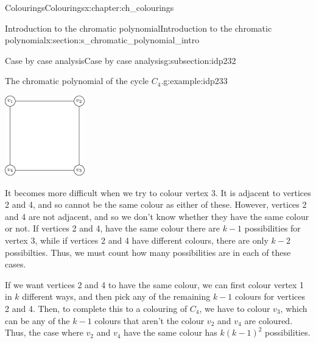 \documentclass[oneside,10pt,]{book}
\numberwithin{equation}{section}
\begin{document}
\begin{chapterptx}{Colourings}{}{Colourings}{}{}{x:chapter:ch_colourings}
\begin{sectionptx}{Introduction to the chromatic polynomial}{}{Introduction to the chromatic polynomial}{}{}{x:section:s_chromatic_polynomial_intro}
\begin{subsectionptx}{Case by case analysis}{}{Case by case analysis}{}{}{g:subsection:idp232}
\begin{example}{The chromatic polynomial of the cycle \(C_4\).}{g:example:idp233}
\begin{sidebyside}{2}{0.025}{0.025}{0.05}
\begin{sbspanel}{0.6}
\end{sbspanel}%
\begin{sbspanel}{0.3}%
\includegraphics[width=\linewidth]{images/c4.png}
\end{sbspanel}%
\end{sidebyside}%
It becomes more difficult when we try to colour vertex 3.  It is adjacent to vertices 2 and 4, and so cannot be the same colour as either of these.  However, vertices 2 and 4 are not adjacent, and so we don't know whether they have the same colour or not.  If vertices 2 and 4, have the same colour there are \(k-1\) possibilities for vertex 3, while if vertices 2 and 4 have different colours, there are only \(k-2\) possibilties.  Thus, we must count how many possibilities are in each of these cases.%
\par
If we want vertices 2 and 4 to have the same colour, we can first colour vertex 1 in \(k\) different ways, and then pick any of the remaining \(k-1\) colours for vertices 2 and 4.  Then, to complete this to a colouring of \(C_4\), we have to colour \(v_3\), which can be any of the \(k-1\) colours that aren't the colour \(v_2\) and \(v_4\) are coloured.  Thus, the case where \(v_2\) and \(v_4\) have the same colour has \(k(k-1)^2\) possibilities.%
\par

\end{example}
\end{subsectionptx}
\end{sectionptx}
\end{chapterptx}
\end{document}
